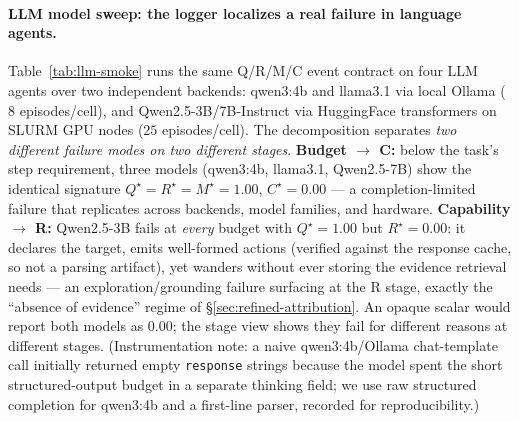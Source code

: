 \documentclass{article}
\begin{document}
\paragraph{LLM model sweep: the logger localizes a real failure in language agents.}
Table~\ref{tab:llm-smoke} runs the same Q/R/M/C event contract on four LLM agents over two independent backends: qwen3:4b and llama3.1 via local Ollama ($8$ episodes/cell), and Qwen2.5-3B/7B-Instruct via HuggingFace transformers on SLURM GPU nodes ($25$ episodes/cell). The decomposition separates \emph{two different failure modes on two different stages}. \textbf{Budget $\to$ C:} below the task's step requirement, three models (qwen3:4b, llama3.1, Qwen2.5-7B) show the identical signature $Q^\star{=}R^\star{=}M^\star{=}1.00$, $C^\star{=}0.00$ --- a completion-limited failure that replicates across backends, model families, and hardware. \textbf{Capability $\to$ R:} Qwen2.5-3B fails at \emph{every} budget with $Q^\star{=}1.00$ but $R^\star{=}0.00$: it declares the target, emits well-formed actions (verified against the response cache, so not a parsing artifact), yet wanders without ever storing the evidence retrieval needs --- an exploration/grounding failure surfacing at the R stage, exactly the ``absence of evidence'' regime of \S\ref{sec:refined-attribution}. An opaque scalar would report both models as $0.00$; the stage view shows they fail for different reasons at different stages. (Instrumentation note: a naive qwen3:4b/Ollama chat-template call initially returned empty \texttt{response} strings because the model spent the short structured-output budget in a separate thinking field; we use raw structured completion for qwen3:4b and a first-line parser, recorded for reproducibility.)
\end{document}
